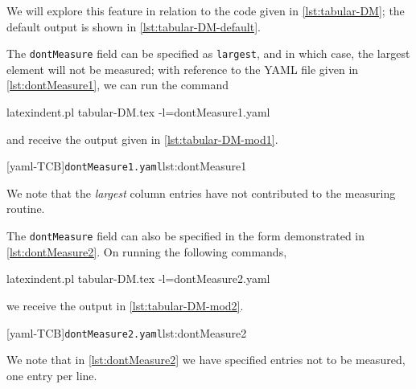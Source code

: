  \begin{example}
 We will explore this feature in relation to the code given in \cref{lst:tabular-DM}; the
 default output is shown in \cref{lst:tabular-DM-default}. %

 \begin{cmhtcbraster}[raster left skip=-1.5cm,]
 \end{cmhtcbraster}

 The \texttt{dontMeasure} field can be specified as \texttt{largest}, and in which case,
 the largest element will not be measured; with reference to the YAML file given in
 \cref{lst:dontMeasure1}, we can run the command 

 \begin{commandshell} 
latexindent.pl tabular-DM.tex -l=dontMeasure1.yaml
\end{commandshell}

 and receive the output given in \cref{lst:tabular-DM-mod1}.

 \begin{cmhtcbraster}
  [yaml-TCB]{\texttt{dontMeasure1.yaml}}{lst:dontMeasure1}
 \end{cmhtcbraster}

 We note that the \emph{largest} column entries have not contributed to the measuring
 routine.
 \end{example}

 \begin{example}
 The \texttt{dontMeasure} field can also be specified in the form demonstrated in
 \cref{lst:dontMeasure2}. On running the following commands, 

 \begin{commandshell} 
latexindent.pl tabular-DM.tex -l=dontMeasure2.yaml
\end{commandshell}

 we receive the output in \cref{lst:tabular-DM-mod2}. 

 \begin{cmhtcbraster}
  [yaml-TCB]{\texttt{dontMeasure2.yaml}}{lst:dontMeasure2}
 \end{cmhtcbraster}

 We note that in \cref{lst:dontMeasure2} we have specified entries not to be measured, one
 entry per line.
 \end{example}

